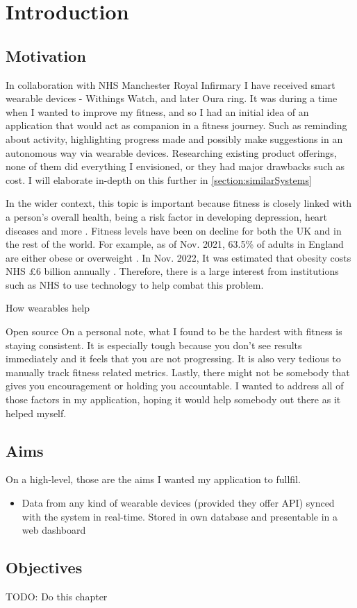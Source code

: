 \chapter{Introduction}
\label{cha:intro}

\section{Motivation}
\par
In collaboration with NHS Manchester Royal Infirmary I have received smart wearable devices - Withings Watch,
and later Oura ring. It was during a time when I wanted to improve my fitness, and so I had an initial idea of an
application that would act as companion in a fitness journey. Such as reminding about activity, highlighting progress made and
possibly make suggestions in an autonomous way via wearable devices. Researching existing product offerings, none of them 
did everything I envisioned, or they had major drawbacks such as cost. I will elaborate in-depth on this further in \ref{section:similarSystems}
\par
In the wider context, this topic is important because fitness is closely linked with a person's overall health, being a risk factor in developing depression, heart diseases and more \cite{nhsObesity}. 
Fitness levels have been on decline for both the UK and in the rest of the world.
For example, as of Nov. 2021, 63.5\% of adults in England are either obese or overweight \cite{ukObesity2023Survey}. 
In Nov. 2022, It was estimated that obesity costs NHS £6 billion annually \cite{nhsObesityCost}.
Therefore, there is a large interest from institutions such as NHS to use technology to help combat this problem.
\par How wearables help
\par Open source
On a personal note, what I found to be the hardest with fitness is staying consistent. It is especially tough because you don't 
see results immediately and it feels that you are not progressing. It is also very tedious to manually track fitness related metrics.
Lastly, there might not be somebody that gives you encouragement or holding you accountable. I wanted to address all of those factors in my application, hoping it would help somebody out there as it helped myself.
\section{Aims}
On a high-level, those are the aims I wanted my application to fullfil.
\begin{itemize}
    \item {Data from any kind of wearable devices (provided they offer API) synced with the system in real-time. Stored in own database and presentable in a web dashboard}
\end{itemize}
\section{Objectives}


TODO: Do this chapter
